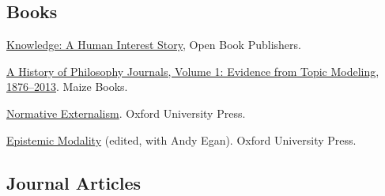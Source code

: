 \documentclass[
  10pt,
  letterpaper,
  DIV=11,
  numbers=noendperiod,
  twoside]{scrartcl}
\providecommand{\tightlist}{%
  \setlength{\itemsep}{0pt}\setlength{\parskip}{0pt}}
\begin{document}
\subsection{Books}\label{books}

\begin{description}
\tightlist
\item[2024]
\href{https://www.openbookpublishers.com/books/10.11647/obp.0425}{Knowledge:
A Human Interest Story}, Open Book Publishers.
\item[2022]
\href{https://www.fulcrum.org/concern/monographs/2v23vw98g}{A History of
Philosophy Journals, Volume 1: Evidence from Topic Modeling,
1876--2013}. Maize Books.
\item[2019]
\href{https://global.oup.com/academic/product/normative-externalism-9780199696536}{Normative
Externalism}. Oxford University Press.
\item[2011]
\href{https://global.oup.com/academic/product/epistemic-modality-9780199591589}{Epistemic
Modality} (edited, with Andy Egan). Oxford University Press.
\end{description}

\subsection{Journal Articles}\label{journal-articles}
\end{document}
